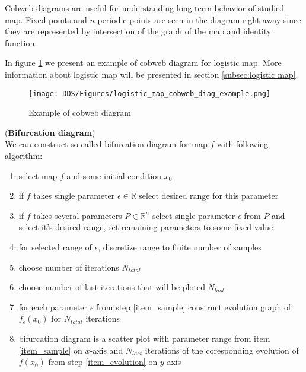 \begin{remark}
    Cobweb diagrams are useful for understanding long term behavior of studied map.
    Fixed points and $n$-periodic points are seen in the diagram right away since they are represented by intersection of the graph of the map and identity function.
\end{remark}

\begin{example}
    In figure \ref{fig:cobweb_diag_example} we present an example of cobweb diagram for logistic map. More information about logistic map will be presented in section \ref{subsec:logistic map}.
    \begin{figure}[!h]
        \centering
        \texttt{[image: DDS/Figures/logistic\_map\_cobweb\_diag\_example.png]}
        \caption{Example of cobweb diagram}
        \label{fig:cobweb_diag_example}
    \end{figure}
\end{example}

\begin{definition} (\textbf{Bifurcation diagram}) \\
    \label{def: bif_diag}
    We can construct so called bifurcation diagram for map $f$ with following algorithm:
    \begin{enumerate}
        \item select map $f$ and some initial condition $x_0$
        \item if $f$ takes single parameter $\epsilon \in \mathbb{R}$ select desired range for this parameter
        \item if $f$ takes several parameters $P \in \mathbb{R}^n$ select single parameter $\epsilon$ from $P$ and select it's desired range, set remaining parameters to some fixed value
        \item for selected range of $\epsilon$, discretize range to finite number of samples \label{item_sample}
        \item choose number of iterations $N_{total}$
        \item choose number of last iterations that will be ploted $N_{last}$
        \item for each parameter $\epsilon$ from step \ref{item_sample} construct evolution graph of $f_{\epsilon}(x_0)$ for $N_{total}$ iterations \label{item_evolution}
        \item bifurcation diagram is a scatter plot with parameter range from item \ref{item_sample} on $x$-axis and $N_{last}$ iterations of the coresponding evolution of $f(x_0)$ from step \ref{item_evolution} on $y$-axis
    \end{enumerate}
\end{definition}

